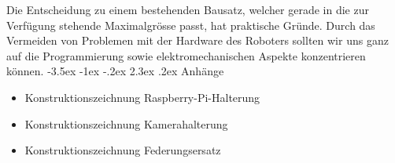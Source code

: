 \documentclass[a4paper]{scrarticle}
\makeatletter
\renewcommand\section{\@startsection {section}{1}{\z@}%
                                   {-3.5ex \@plus -1ex \@minus -.2ex}%
                                   {2.3ex \@plus.2ex}%
                                   {\Huge\AKAfont}}
\makeatother
\begin{document}
Die Entscheidung zu einem bestehenden Bausatz, welcher gerade in die zur Verfügung stehende Maximalgrösse passt, hat praktische Gründe. Durch das Vermeiden von Problemen mit der Hardware des Roboters sollten wir uns ganz auf die Programmierung sowie elektromechanischen Aspekte konzentrieren können.
\section{Anhänge}

\begin{itemize}
	\item Konstruktionszeichnung Raspberry-Pi-Halterung
	\item Konstruktionszeichnung Kamerahalterung
	\item Konstruktionszeichnung Federungsersatz
\end{itemize}





\end{document}
